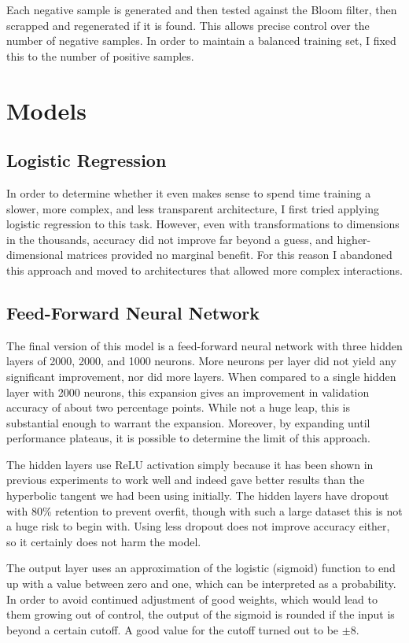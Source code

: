\documentclass[a4paper, 11pt]{scrartcl}
\begin{document}
Each negative sample is generated and then tested against the Bloom filter, then scrapped and regenerated if it is found. This allows precise control over the number of negative samples. In order to maintain a balanced training set, I fixed this to the number of positive samples.


\section{Models}

\subsection{Logistic Regression}
In order to determine whether it even makes sense to spend time training a slower, more complex, and less transparent architecture, I first tried applying logistic regression to this task. However, even with transformations to dimensions in the thousands, accuracy did not improve far beyond a guess, and higher-dimensional matrices provided no marginal benefit. For this reason I abandoned this approach and moved to architectures that allowed more complex interactions.

\subsection{Feed-Forward Neural Network}
The final version of this model is a feed-forward neural network with three hidden layers of 2000, 2000, and 1000 neurons. More neurons per layer did not yield any significant improvement, nor did more layers. When compared to a single hidden layer with 2000 neurons, this expansion gives an improvement in validation accuracy of about two percentage points. While not a huge leap, this is substantial enough to warrant the expansion. Moreover, by expanding until performance plateaus, it is possible to determine the limit of this approach.

The hidden layers use ReLU activation simply because it has been shown in previous experiments to work well and indeed gave better results than the hyperbolic tangent we had been using initially. The hidden layers have dropout with 80\% retention to prevent overfit, though with such a large dataset this is not a huge risk to begin with. Using less dropout does not improve accuracy either, so it certainly does not harm the model.

The output layer uses an approximation of the logistic (sigmoid) function to end up with a value between zero and one, which can be interpreted as a probability. In order to avoid continued adjustment of good weights, which would lead to them growing out of control, the output of the sigmoid is rounded if the input is beyond a certain cutoff. A good value for the cutoff turned out to be $ \pm 8 $.
\end{document}
